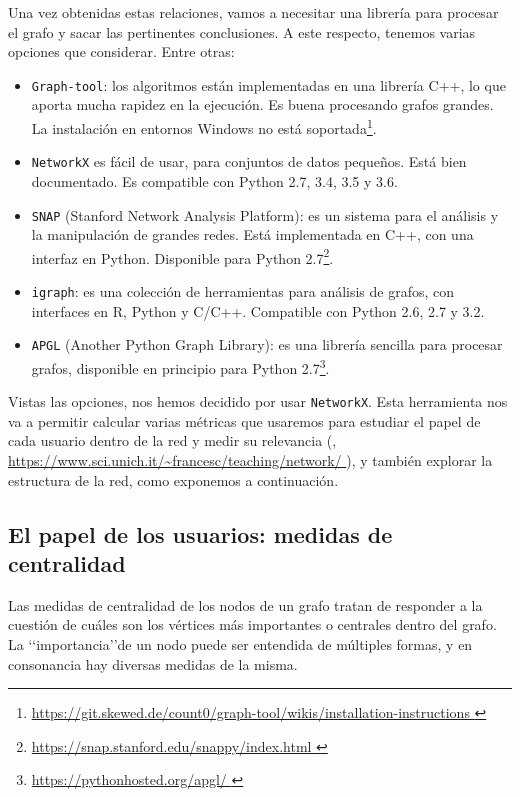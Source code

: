 Una vez obtenidas estas relaciones, vamos a necesitar una librería 
para procesar el grafo y sacar las pertinentes 
conclusiones. A este respecto, tenemos varias opciones que 
considerar. Entre otras:
\begin{itemize}
\item {\tt Graph-tool}: los algoritmos están implementadas en una librería C++, 
lo que aporta mucha rapidez en la ejecución. Es 
buena procesando grafos grandes. La instalación en entornos Windows no
está soportada\footnote{\url{https://git.skewed.de/count0/graph-tool/wikis/installation-instructions 
}}.
\item {\tt NetworkX} es fácil de usar, para conjuntos de datos pequeños. Está bien
documentado. Es compatible con Python 2.7, 3.4, 3.5 y 3.6.
\item {\tt SNAP} (Stanford Network Analysis Platform): es un sistema para el análisis
y la manipulación de grandes redes. Está implementada en C++, con una interfaz en Python. 
Disponible para Python 2.7\footnote{\url{https://snap.stanford.edu/snappy/index.html }}.
\item {\tt igraph}: es una colección de herramientas para análisis de grafos,
con interfaces en R, Python y C/C++. Compatible con Python 2.6, 2.7 y 3.2.
\item {\tt APGL} (Another Python Graph Library): es una librería sencilla
para procesar grafos, disponible en principio para Python 2.7\footnote{\url{https://pythonhosted.org/apgl/ }}.
\end{itemize}

Vistas las opciones, nos hemos decidido por usar {\tt NetworkX}.
Esta herramienta nos va a permitir calcular varias métricas
que usaremos para estudiar el papel de cada usuario dentro de la red
y medir su relevancia (\cite{notas_fernando}, 
\url{https://www.sci.unich.it/~francesc/teaching/network/ }), y también explorar la estructura de la red, como exponemos a continuación.

\subsection{El papel de los usuarios: medidas de centralidad}

Las medidas de centralidad de los nodos de un grafo tratan de responder a la
cuestión de cuáles son los vértices más importantes o centrales dentro del 
grafo. La \lq\lq importancia\rq\rq de un nodo puede ser entendida 
de múltiples formas, y en consonancia hay diversas medidas de la misma.

